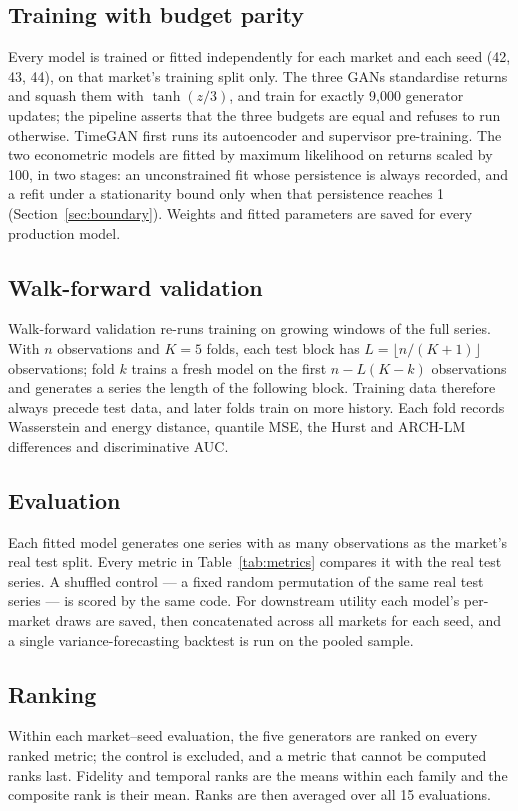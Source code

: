 \documentclass[11pt,a4paper]{article}
\makeatletter
\DeclareRobustCommand{\_}{\ifmmode\nfss@text{\textunderscore}\else\textunderscore\allowbreak\fi}
\makeatother
\begin{document}
\subsection{Training with budget parity}
Every model is trained or fitted independently for each market and each seed (42, 43, 44), on that market's training split only. The three GANs standardise returns and squash them with $\tanh(z/3)$, and train for exactly 9,000 generator updates; the pipeline asserts that the three budgets are equal and refuses to run otherwise. TimeGAN first runs its autoencoder and supervisor pre-training. The two econometric models are fitted by maximum likelihood on returns scaled by 100, in two stages: an unconstrained fit whose persistence is always recorded, and a refit under a stationarity bound only when that persistence reaches 1 (Section~\ref{sec:boundary}). Weights and fitted parameters are saved for every production model.

\subsection{Walk-forward validation}
Walk-forward validation re-runs training on growing windows of the full series. With $n$ observations and $K=5$ folds, each test block has $L=\lfloor n/(K+1)\rfloor$ observations; fold $k$ trains a fresh model on the first $n-L(K-k)$ observations and generates a series the length of the following block. Training data therefore always precede test data, and later folds train on more history. Each fold records Wasserstein and energy distance, quantile MSE, the Hurst and ARCH-LM differences and discriminative AUC.

\subsection{Evaluation}
Each fitted model generates one series with as many observations as the market's real test split. Every metric in Table~\ref{tab:metrics} compares it with the real test series. A shuffled control --- a fixed random permutation of the same real test series --- is scored by the same code. For downstream utility each model's per-market draws are saved, then concatenated across all markets for each seed, and a single variance-forecasting backtest is run on the pooled sample.

\subsection{Ranking}
Within each market--seed evaluation, the five generators are ranked on every ranked metric; the control is excluded, and a metric that cannot be computed ranks last. Fidelity and temporal ranks are the means within each family and the composite rank is their mean. Ranks are then averaged over all 15 evaluations.
\end{document}
